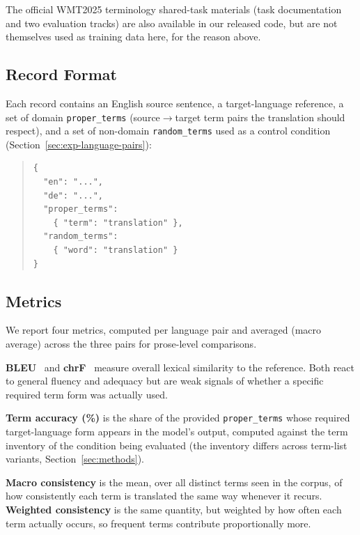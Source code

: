 \documentclass[11pt]{article}
\begin{document}
The official WMT2025 terminology shared-task materials (task documentation and two evaluation tracks) are also available in our released code, but are not themselves used as training data here, for the reason above.

\subsection{Record Format}
\label{sec:record-format}

Each record contains an English source sentence, a target-language reference, a set of domain \texttt{proper\_terms} (source$\rightarrow$target term pairs the translation should respect), and a set of non-domain \texttt{random\_terms} used as a control condition (Section~\ref{sec:exp-language-pairs}):

\begin{quote}
\begin{verbatim}
{
  "en": "...",
  "de": "...",
  "proper_terms":
    { "term": "translation" },
  "random_terms":
    { "word": "translation" }
}
\end{verbatim}
\end{quote}

\subsection{Metrics}
\label{sec:metrics}

We report four metrics, computed per language pair and averaged (macro average) across the three pairs for prose-level comparisons.

\textbf{BLEU}~\citep{papineni-etal-2002-bleu} and \textbf{chrF}~\citep{popovic-2015-chrf} measure overall lexical similarity to the reference. Both react to general fluency and adequacy but are weak signals of whether a specific required term form was actually used.

\textbf{Term accuracy (\%)} is the share of the provided \texttt{proper\_terms} whose required target-language form appears in the model's output, computed against the term inventory of the condition being evaluated (the inventory differs across term-list variants, Section~\ref{sec:methods}).

\textbf{Macro consistency} is the mean, over all distinct terms seen in the corpus, of how consistently each term is translated the same way whenever it recurs. \textbf{Weighted consistency} is the same quantity, but weighted by how often each term actually occurs, so frequent terms contribute proportionally more.
\end{document}
